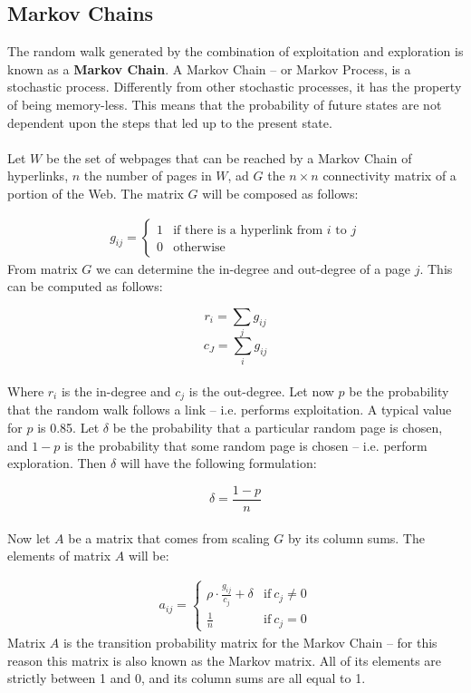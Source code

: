 \documentclass{article}
\begin{document}
\subsection{Markov Chains}
The random walk generated by the combination of exploitation and exploration is known as a \textbf{Markov Chain}. A Markov Chain -- or Markov Process, is a stochastic process. Differently from other stochastic processes, it has the property of being memory-less. This means that the probability of future states are not dependent upon the steps that led up to the present state. \\ \\
Let $W$ be the set of webpages that can be reached by a Markov Chain of hyperlinks, $n$ the number of pages in $W$, ad $G$ the $n \times n$ connectivity matrix of a portion of the Web. The matrix $G$ will be composed as follows:

\begin{align*}
	g_{ij} = \begin{cases} 1 & \text{if there is a hyperlink from $i$ to $j$} \\ 0 & \text{otherwise} \end{cases}
\end{align*}
From matrix $G$ we can determine the in-degree and out-degree of a page $j$. This can be computed as follows:

\[ r_i = \sum_j g_{ij} \]
\[ c_J = \sum_i g_{ij} \] \\
Where $r_i$ is the in-degree and $c_j$ is the out-degree. Let now $p$ be the probability that the random walk follows a link -- i.e. performs exploitation. A typical value for $p$ is 0.85. Let $\delta$ be the probability that a particular random page is chosen, and $1-p$ is the probability that some random page is chosen -- i.e. perform exploration. Then $\delta$ will have the following formulation:

\[ \delta = \frac{1-p}{n} \] \\
Now let $A$ be a matrix that comes from scaling $G$ by its column sums. The elements of matrix $A$ will be:

\begin{align*}
	a_{ij} = \begin{cases} \rho \cdot \frac{g_{ij}}{c_j} + \delta & \text{if}~c_j \neq 0 \\ \frac{1}{n} & \text{if}~ c_j = 0 \end{cases}
\end{align*}
Matrix $A$ is the transition probability matrix for the Markov Chain -- for this reason this matrix is also known as the Markov matrix. All of its elements are strictly between 1 and 0, and its column sums are all equal to 1.
\end{document}
